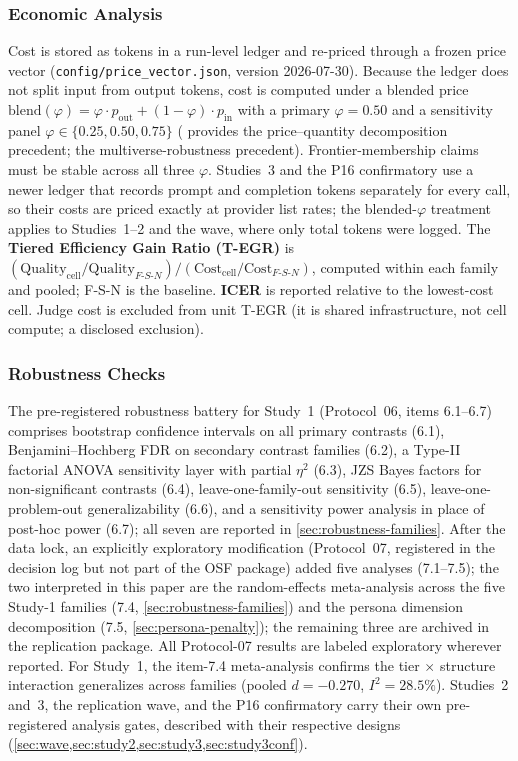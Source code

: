 \documentclass[12pt,a4paper]{article}
\newcommand{\phiBlend}{\varphi}
\begin{document}
\subsubsection{Economic Analysis}

Cost is stored as tokens in a run-level ledger and re-priced through a frozen
price vector (\texttt{config/price\_vector.json}, version 2026-07-30). Because
the ledger does not split input from output tokens, cost is computed under a
blended price $\mathrm{blend}(\phiBlend) = \phiBlend \cdot p_{\mathrm{out}} +
(1 - \phiBlend) \cdot p_{\mathrm{in}}$ with a primary $\phiBlend = 0.50$ and a
sensitivity panel $\phiBlend \in \{0.25, 0.50, 0.75\}$ (\citealt{Diewert1976}
provides the price--quantity decomposition precedent; \citealt{SteegenEtAl2016}
the multiverse-robustness precedent). Frontier-membership claims must be stable
across all three $\phiBlend$. Studies~3 and the P16 confirmatory use a newer
ledger that records prompt and completion tokens separately for every call, so
their costs are priced exactly at provider list rates; the
blended-$\phiBlend$ treatment applies to Studies~1--2 and the wave, where only
total tokens were logged. The \textbf{Tiered Efficiency Gain Ratio (T-EGR)}
is $(\mathrm{Quality}_{\mathrm{cell}} / \mathrm{Quality}_{F\text{-}S\text{-}N})
/ (\mathrm{Cost}_{\mathrm{cell}} / \mathrm{Cost}_{F\text{-}S\text{-}N})$,
computed within each family and pooled; F-S-N is the baseline. \textbf{ICER} is
reported relative to the lowest-cost cell. Judge cost is excluded from unit T-EGR
(it is shared infrastructure, not cell compute; a disclosed exclusion).

\subsubsection{Robustness Checks}

The pre-registered robustness battery for Study~1 (Protocol~06,
items 6.1--6.7) comprises
bootstrap confidence intervals on all primary contrasts (6.1),
Benjamini--Hochberg FDR on secondary contrast families (6.2), a Type-II
factorial ANOVA sensitivity layer with partial $\eta^2$ (6.3), JZS Bayes
factors for non-significant contrasts (6.4), leave-one-family-out
sensitivity (6.5), leave-one-problem-out generalizability (6.6), and a
sensitivity power analysis in place of post-hoc power (6.7); all seven are
reported in \cref{sec:robustness-families}. After the data
lock, an explicitly exploratory modification (Protocol~07, registered in the
decision log but not part of the OSF package) added five analyses
(7.1--7.5); the two
interpreted in this paper are the random-effects meta-analysis across the five
Study-1 families (7.4, \cref{sec:robustness-families}) and the persona
dimension decomposition (7.5, \cref{sec:persona-penalty}); the remaining
three are archived in the replication package. All Protocol-07 results are labeled
exploratory wherever reported. For Study~1, the item-7.4 meta-analysis confirms
the tier $\times$ structure interaction generalizes across families
(pooled $d = -0.270$, $I^2 = 28.5\%$). Studies~2 and~3, the replication
wave, and the P16 confirmatory carry their own pre-registered analysis gates,
described with their respective designs
(\cref{sec:wave,sec:study2,sec:study3,sec:study3conf}).
\end{document}
